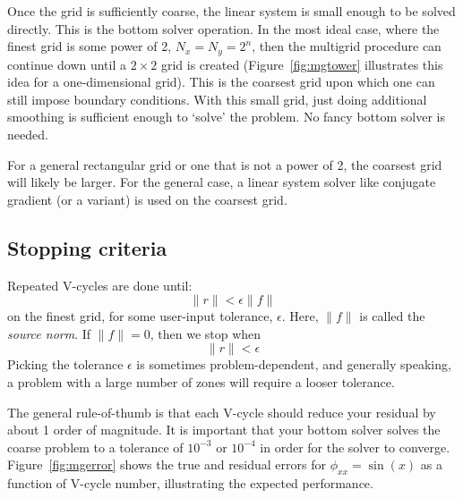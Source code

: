 Once the grid is sufficiently coarse, the linear system is small
enough to be solved directly.  This is the bottom solver operation.
In the most ideal case, where the finest grid is some power of 2, $N_x
= N_y = 2^n$, then the multigrid procedure can continue down until a
$2\times 2$ grid is created (Figure~\ref{fig:mgtower} illustrates this idea
for a one-dimensional grid).  This is the coarsest grid upon which one
can still impose boundary conditions.  With this small grid, just
doing additional smoothing is sufficient enough to `solve' the
problem.  No fancy bottom solver is needed.

For a general rectangular grid or one that is not a power of 2, the
coarsest grid will likely be larger.  For the general case, a linear
system solver like conjugate gradient (or a variant) is used on the
coarsest grid.

\subsection{Stopping criteria}

Repeated V-cycles are done until:
\begin{equation}
\| r \| < \epsilon \|f\|
\end{equation}
on the finest grid, for some user-input tolerance, $\epsilon$.  Here,
$\|f\|$ is called the {\em source norm}.  If $\|f\| = 0$, then we stop
when
\begin{equation}
\| r \| < \epsilon 
\end{equation}
Picking the tolerance $\epsilon$ is sometimes problem-dependent, and
generally speaking, a problem with a large number of zones will require
a looser tolerance.

The general rule-of-thumb is that each V-cycle should reduce your
residual by about 1 order of magnitude.  It is important that your
bottom solver solves the coarse problem to a tolerance of $10^{-3}$ or
$10^{-4}$ in order for the solver to converge.  Figure~\ref{fig:mgerror}
shows the true and residual errors for $\phi_{xx} = \sin(x)$ as a function
of V-cycle number, illustrating the expected performance.

